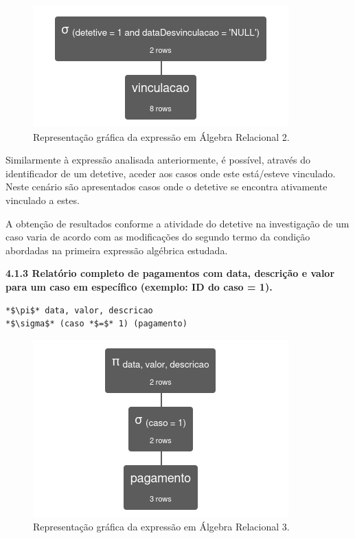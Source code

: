 \documentclass[a4paper,12pt]{scrreprt}
\begin{document}
\begin{figure}[!ht]
    \centering
    \includegraphics[scale=0.9]{images/relax/2.png}
    \caption{Representação gráfica da expressão em Álgebra Relacional 2.}
\end{figure}
\vspace{0.2cm}

Similarmente à expressão analisada anteriormente, é possível, através do identificador de um detetive, aceder aos casos onde este está/esteve vinculado. Neste cenário são apresentados casos onde o detetive se encontra ativamente vinculado a estes.

A obtenção de resultados conforme a atividade do detetive na investigação de um caso varia de acordo com as modificações do segundo termo da condição abordadas na primeira expressão algébrica estudada.

\clearpage %
{\large\textbf{4.1.3 Relatório completo de pagamentos com data, descrição e valor para um caso em específico (exemplo: ID do caso = 1).}}

\vspace{0.2cm}
\begin{lstlisting}[escapechar=*]
*$\pi$* data, valor, descricao
*$\sigma$* (caso *$=$* 1) (pagamento)
\end{lstlisting}

\begin{figure}[!ht]
    \centering
    \includegraphics[scale=0.9]{images/relax/3.png}
    \caption{Representação gráfica da expressão em Álgebra Relacional 3.}
\end{figure}
\vspace{0.2cm}
\end{document}
